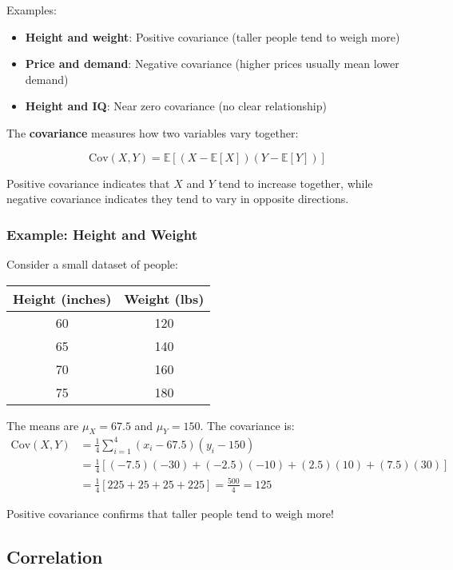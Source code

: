 Examples:
\begin{itemize}
    \item \textbf{Height and weight}: Positive covariance (taller people tend to weigh more)
    \item \textbf{Price and demand}: Negative covariance (higher prices usually mean lower demand)
    \item \textbf{Height and IQ}: Near zero covariance (no clear relationship)
\end{itemize}

The \textbf{covariance} measures how two variables vary together:

\begin{equation}
\text{Cov}(X, Y) = \mathbb{E}[(X - \mathbb{E}[X])(Y - \mathbb{E}[Y])]
\end{equation}

Positive covariance indicates that $X$ and $Y$ tend to increase together, while negative covariance indicates they tend to vary in opposite directions.

\subsubsection{Example: Height and Weight}

Consider a small dataset of people:
\begin{center}
\begin{tabular}{|c|c|}
\hline
Height (inches) & Weight (lbs) \\
\hline
60 & 120 \\
65 & 140 \\
70 & 160 \\
75 & 180 \\
\hline
\end{tabular}
\end{center}

The means are $\mu_X = 67.5$ and $\mu_Y = 150$. The covariance is:
\begin{align}
\text{Cov}(X,Y) &= \frac{1}{4}\sum_{i=1}^{4}(x_i - 67.5)(y_i - 150) \\
&= \frac{1}{4}[(-7.5)(-30) + (-2.5)(-10) + (2.5)(10) + (7.5)(30)] \\
&= \frac{1}{4}[225 + 25 + 25 + 225] = \frac{500}{4} = 125
\end{align}

Positive covariance confirms that taller people tend to weigh more!

\subsection{Correlation}

